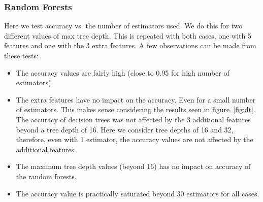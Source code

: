 \documentclass{article}
\begin{document}
\subsubsection{Random Forests}

Here we test accuracy vs. the number of estimators used. We do this for two different values of max tree depth. This is repeated with both cases, one with 5 features and one with the 3 extra features. A few observations can be made from these tests:
\begin{itemize}
\item The accuracy values are fairly high (close to 0.95 for high number of estimators).
\item The extra features have no impact on the accuracy. Even for a small number of estimators. This makes sense considering the results seen in figure~\ref{fig:dt}. The accuracy of decision trees was not affected by the 3 additional features beyond a tree depth of 16. Here we consider tree depths of 16 and 32, therefore, even with 1 estimator, the accuracy values are not affected by the additional features.
\item The maximum tree depth values (beyond 16) has no impact on accuracy of the random forests.
\item The accuracy value is practically saturated beyond 30 estimators for all cases.
\end{itemize}
\end{document}
